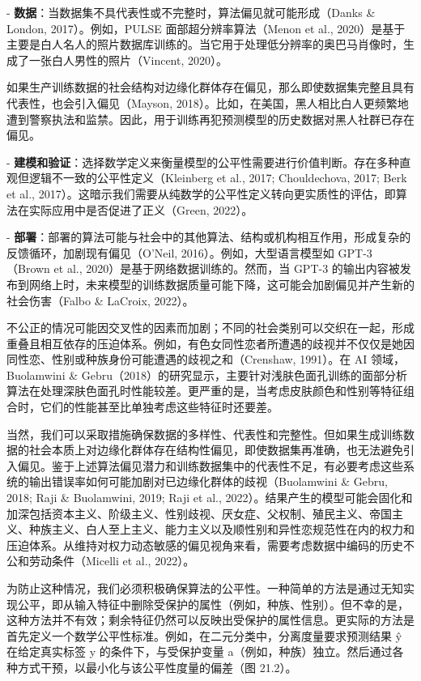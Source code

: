 - \textbf{数据}：当数据集不具代表性或不完整时，算法偏见就可能形成（Danks \& London, 2017）。例如，PULSE 面部超分辨率算法（Menon et al., 2020）是基于主要是白人名人的照片数据库训练的。当它用于处理低分辨率的奥巴马肖像时，生成了一张白人男性的照片（Vincent, 2020）。

如果生产训练数据的社会结构对边缘化群体存在偏见，那么即使数据集完整且具有代表性，也会引入偏见（Mayson, 2018）。比如，在美国，黑人相比白人更频繁地遭到警察执法和监禁。因此，用于训练再犯预测模型的历史数据对黑人社群已存在偏见。

- \textbf{建模和验证}：选择数学定义来衡量模型的公平性需要进行价值判断。存在多种直观但逻辑不一致的公平性定义（Kleinberg et al., 2017; Chouldechova, 2017; Berk et al., 2017）。这暗示我们需要从纯数学的公平性定义转向更实质性的评估，即算法在实际应用中是否促进了正义（Green, 2022）。

- \textbf{部署}：部署的算法可能与社会中的其他算法、结构或机构相互作用，形成复杂的反馈循环，加剧现有偏见（O’Neil, 2016）。例如，大型语言模型如 GPT-3（Brown et al., 2020）是基于网络数据训练的。然而，当 GPT-3 的输出内容被发布到网络上时，未来模型的训练数据质量可能下降，这可能会加剧偏见并产生新的社会伤害（Falbo \& LaCroix, 2022）。

不公正的情况可能因交叉性的因素而加剧；不同的社会类别可以交织在一起，形成重叠且相互依存的压迫体系。例如，有色女同性恋者所遭遇的歧视并不仅仅是她因同性恋、性别或种族身份可能遭遇的歧视之和（Crenshaw, 1991）。在 AI 领域，Buolamwini \& Gebru（2018）的研究显示，主要针对浅肤色面孔训练的面部分析算法在处理深肤色面孔时性能较差。更严重的是，当考虑皮肤颜色和性别等特征组合时，它们的性能甚至比单独考虑这些特征时还要差。

当然，我们可以采取措施确保数据的多样性、代表性和完整性。但如果生成训练数据的社会本质上对边缘化群体存在结构性偏见，即使数据集再准确，也无法避免引入偏见。鉴于上述算法偏见潜力和训练数据集中的代表性不足，有必要考虑这些系统的输出错误率如何可能加剧对已边缘化群体的歧视（Buolamwini \& Gebru, 2018; Raji \& Buolamwini, 2019; Raji et al., 2022）。结果产生的模型可能会固化和加深包括资本主义、阶级主义、性别歧视、厌女症、父权制、殖民主义、帝国主义、种族主义、白人至上主义、能力主义以及顺性别和异性恋规范性在内的权力和压迫体系。从维持对权力动态敏感的偏见视角来看，需要考虑数据中编码的历史不公和劳动条件（Micelli et al., 2022）。

为防止这种情况，我们必须积极确保算法的公平性。一种简单的方法是通过无知实现公平，即从输入特征中删除受保护的属性（例如，种族、性别）。但不幸的是，这种方法并不有效；剩余特征仍然可以反映出受保护的属性信息。更实际的方法是首先定义一个数学公平性标准。例如，在二元分类中，分离度量要求预测结果 ŷ 在给定真实标签 y 的条件下，与受保护变量 a（例如，种族）独立。然后通过各种方式干预，以最小化与该公平性度量的偏差（图 21.2）。

